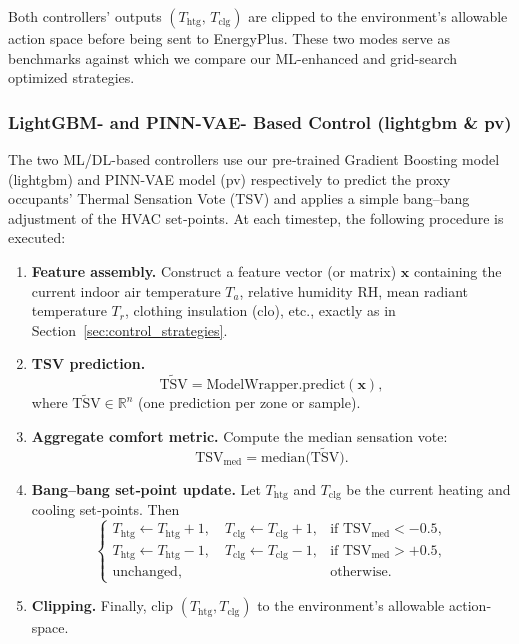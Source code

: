 Both controllers’ outputs \((T_\mathrm{htg},\,T_\mathrm{clg})\) are clipped to the environment’s allowable action space before being sent to EnergyPlus. These two modes serve as benchmarks against which we compare our ML­-enhanced and grid-search optimized strategies.

\subsubsection{LightGBM- and PINN-VAE- Based Control (lightgbm \& pv)}
\label{sec:lightgbm_control}

The two ML/DL-based controllers use our pre‐trained Gradient Boosting model (lightgbm) and PINN-VAE model (pv) respectively to predict the proxy occupants’ Thermal Sensation Vote (TSV) and applies a simple bang–bang adjustment of the HVAC set‐points. At each timestep, the following procedure is executed:

\begin{enumerate}
  \item \textbf{Feature assembly.} Construct a feature vector (or matrix) \(\mathbf{x}\) containing the current indoor air temperature \(T_a\), relative humidity RH, mean radiant temperature \(T_r\), clothing insulation (\(\mathrm{clo}\)), etc., exactly as in Section~\ref{sec:control_strategies}.
  \item \textbf{TSV prediction.}  
    \[
      \widetilde{\mathrm{TSV}} = \mathrm{ModelWrapper.predict}(\mathbf{x}),
    \]
    where \(\widetilde{\mathrm{TSV}}\in\mathbb{R}^n\) (one prediction per zone or sample).  
  \item \textbf{Aggregate comfort metric.} Compute the median sensation vote:
    \[
      \mathrm{TSV}_{\mathrm{med}} = \mathrm{median}\bigl(\widetilde{\mathrm{TSV}}\bigr).
    \]
  \item \textbf{Bang–bang set‐point update.} Let \(T_{\mathrm{htg}}\) and \(T_{\mathrm{clg}}\) be the current heating and cooling set‐points. Then
    \[
    \begin{cases}
      T_{\mathrm{htg}} \leftarrow T_{\mathrm{htg}} + 1,\quad
      T_{\mathrm{clg}} \leftarrow T_{\mathrm{clg}} + 1, 
      & \text{if } \mathrm{TSV}_{\mathrm{med}} < -0.5,\\[6pt]
      T_{\mathrm{htg}} \leftarrow T_{\mathrm{htg}} - 1,\quad
      T_{\mathrm{clg}} \leftarrow T_{\mathrm{clg}} - 1, 
      & \text{if } \mathrm{TSV}_{\mathrm{med}} > +0.5,\\[6pt]
      \text{unchanged,} & \text{otherwise.}
    \end{cases}
    \]
  \item \textbf{Clipping.} Finally, clip \((T_{\mathrm{htg}},T_{\mathrm{clg}})\) to the environment’s allowable action‐space.
\end{enumerate}

